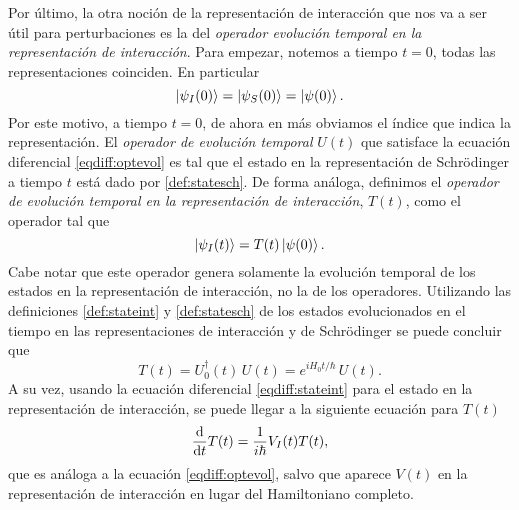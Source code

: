 \documentclass[10pt, a4paper]{article}
\numberwithin{equation}{subsection}
\begin{document}
\bigbreak

Por último, la otra noción de la representación de interacción que nos va a ser
útil para perturbaciones es la del \emph{operador evolución temporal en la
representación de interacción}. Para empezar, notemos a tiempo $t = 0$, todas
las representaciones coinciden. En particular
\begin{equation}
  \ket{\psi_I(0)} = \ket{\psi_S(0)} = \ket{\psi(0)}.
\end{equation}
Por este motivo, a tiempo $t = 0$, de ahora en más obviamos el índice que
indica la representación. El \emph{operador de evolución temporal} $U(t)$ que
satisface la ecuación diferencial \eqref{eqdiff:optevol} es tal que el estado
en la representación de Schrödinger a tiempo $t$ está dado por
\eqref{def:statesch}. De forma análoga, definimos el \emph{operador de
evolución temporal en la representación de interacción}, $T(t)$, como el
operador tal que
\begin{equation}
  \ket{\psi_I(t)} = T(t)\ket{\psi(0)}.
\end{equation}
Cabe notar que este operador genera solamente la evolución temporal de los
estados en la representación de interacción, no la de los operadores. Utilizando
las definiciones \eqref{def:stateint} y \eqref{def:statesch} de los estados
evolucionados en el tiempo en las representaciones de interacción y de
Schrödinger se puede concluir que
\begin{equation}
  T(t) = U^\dagger_0(t)\,U(t) = e^{iH_0t/\hbar}\,U(t).
\end{equation}
A su vez, usando la ecuación diferencial \eqref{eqdiff:stateint} para el estado
en la representación de interacción, se puede llegar a la siguiente ecuación
para $T(t)$
\begin{equation}
  \dv{t}T(t) = \frac{1}{i\hbar}V_{I}(t)T(t),
\end{equation}
que es análoga a la ecuación \eqref{eqdiff:optevol}, salvo que aparece $V(t)$
en la representación de interacción en lugar del Hamiltoniano completo.

\end{document}
